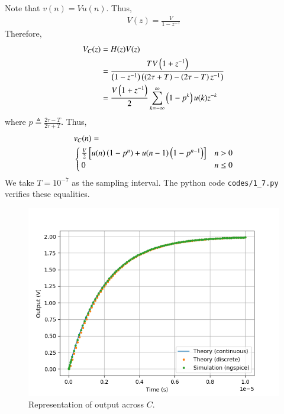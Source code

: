 \documentclass[journal,12pt,twocolumn]{IEEEtran}
\renewcommand\thesection{\arabic{section}}
\begin{document}
\begin{enumerate}[label=\arabic*.,ref=\thesection.\theenumi]
\solution Note that $v(n) = Vu(n)$. Thus,
\begin{align}
    V(z) = \frac{V}{1-z^{-1}}
\end{align}
Therefore,
\begin{align}
    V_C(z) &= H(z)V(z) \\
         &= \frac{TV\left(1+z^{-1}\right)}{\left(1-z^{-1}\right)\left(\left(2\tau+T\right)-\left(2\tau-T\right)z^{-1}\right)} \\
         &= \frac{V\left(1+z^{-1}\right)}{2}\sum_{k=-\infty}^{\infty}\left(1-p^k\right)u(k)z^{-k}
\end{align}
where $p \triangleq \frac{2\tau-T}{2\tau+T}$. Thus,
\begin{align}
    &v_C(n) = \nonumber \\
    &\begin{cases}
        \frac{V}{2}{}\left[u(n)\left(1-p^n\right)+u(n-1)\left(1-p^{n-1}\right)\right] & n > 0 \\
        0 & n \le 0
    \end{cases}
    \label{eq:vn}
\end{align}
We take $T = 10^{-7}$ as the
sampling interval. The python code \texttt{codes/1\_7.py} verifies
these equalities.
\begin{figure}
    \includegraphics[width=\columnwidth]{figs/1_7.png}
    \caption{Representation of output across $C$.}
    \label{fig:vc}
\end{figure}
\end{enumerate}
\end{document}
